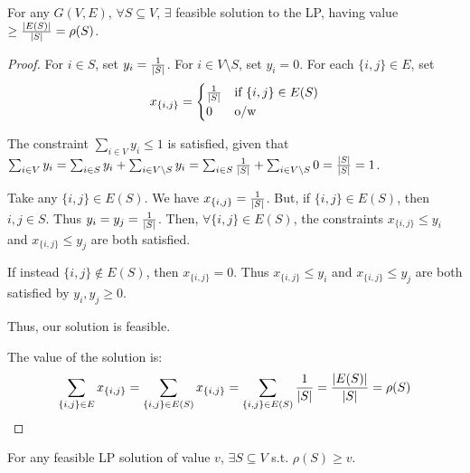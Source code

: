     \begin{lemma}\label{lemma:densestsubgraph_1}
        For any $G(V,E)$, $\forall S \subseteq V$, $\exists$ feasible solution to the LP, having value $\geq \frac{\vert E(S) \vert}{\vert S \vert} = \rho(S)$.
    \end{lemma}

    \begin{proof}
        For $i \in S$, set $y_i = \frac{1}{\vert S \vert}$.
        For $i \in V \setminus S$, set $y_i = 0$.
        For each $\{i,j\} \in E$, set
        \begin{equation}
            x_{\{i,j\}} = 
            \begin{cases}
                \frac{1}{\vert S \vert} & \text{if } \{i,j\} \in E(S)\\
                0                           & \text{o/w}
            \end{cases}
        \end{equation}

        The constraint $\sum_{i \in V} y_i \leq 1$ is satisfied, given that
        $\sum_{i \in V} y_i = \sum_{i \in S} y_i + \sum_{i \in V \setminus S} y_i = \sum_{i \in S} \frac{1}{\vert S \vert} + \sum_{i \in V \setminus S} 0 = \frac{\vert S \vert}{\vert S \vert} = 1$.

        Take any $\{i,j\} \in E(S)$. We have $x_{\{i,j\}} = \frac{1}{\vert S \vert}$.
        But, if $\{i,j\} \in E(S)$, then $i,j \in S$. Thus $y_i = y_j = \frac{1}{\vert S \vert}$.
        Then, $\forall \{i,j\} \in E(S)$, the constraints $x_{\{i,j\}} \leq y_i$ and $x_{\{i,j\}} \leq y_j$ are both satisfied.

        If instead $\{i,j\} \not\in E(S)$, then $x_{\{i,j\}} = 0$.
        Thus $x_{\{i,j\}} \leq y_i$ and $x_{\{i,j\}} \leq y_j$ are both satisfied by $y_i, y_j \geq 0$.

        Thus, our solution is feasible.

        The value of the solution is:
        \[ \sum_{\{i,j\} \in E} x_{\{i,j\}} = \sum_{\{i,j\} \in E(S)} x_{\{i,j\}} = \sum_{\{i,j\} \in E(S)} \frac{1}{\vert S \vert} = \dfrac{\vert E(S) \vert}{\vert S \vert} = \rho(S) \]
    \end{proof}

    \begin{lemma}\label{lemma:densestsubgraph_2}
        For any feasible LP solution of value $v$, $\exists S \subseteq V$ s.t. $\rho(S) \geq v$.
    \end{lemma}

